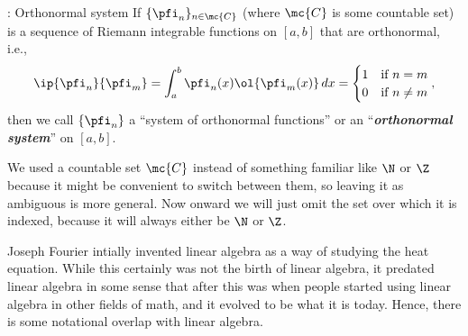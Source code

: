 \begin{ndef}{: Orthonormal system}
    If \(\{\pfi_n\}_{n\in \mc{C}}\) (where \(\mc{C}\) is some countable set) is a sequence of Riemann integrable functions on \([a,b]\) that are orthonormal, i.e., 
    \begin{equation*} 
        \ip{\pfi_n}{\pfi_m}=\int_a^b \pfi_n(x)\ol{\pfi_m(x)} \, dx=\begin{cases}
                                                                    1&\text{if}~n=m\\
                                                                    0&\text{if}~n\neq m
                                                                   \end{cases},
    \end{equation*}
    then we call \(\{\pfi_n\}\) a ``system of orthonormal functions'' or an ``\emph{\textbf{orthonormal system}}'' on \([a,b]\).
\end{ndef}
\begin{note}
    We used a countable set \(\mc{C}\) instead of something familiar like \(\N\) or \(\Z\) because it might be convenient to switch between them, so leaving it as ambiguous is more general. Now onward we will just omit the set over which it is indexed, because it will always either be \(\N\) or \(\Z\).
\end{note}
\begin{note}
    Joseph Fourier intially invented linear algebra as a way of studying the heat equation. While this certainly was not the birth of linear algebra, it predated linear algebra in some sense that after this was when people started using linear algebra in other fields of math, and it evolved to be what it is today. Hence, there is some notational overlap with linear algebra.
\end{note}
